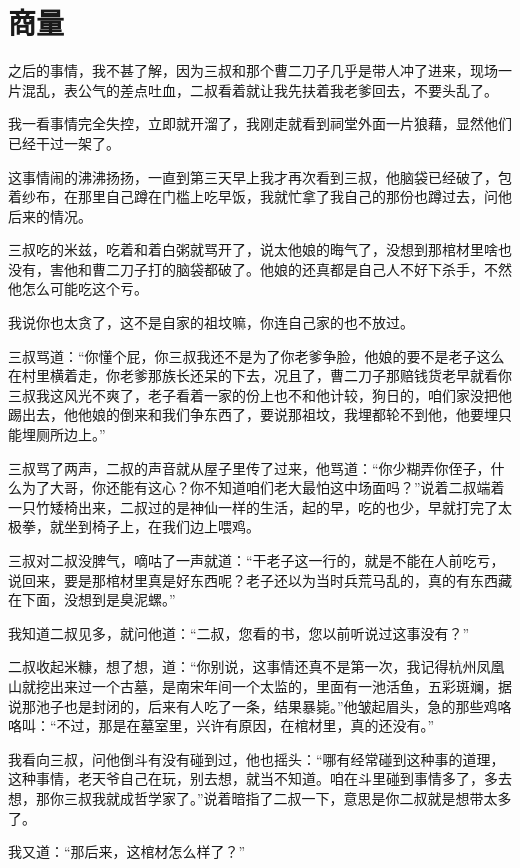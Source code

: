 \chapter{商量}

之后的事情，我不甚了解，因为三叔和那个曹二刀子几乎是带人冲了进来，现场一片混乱，表公气的差点吐血，二叔看着就让我先扶着我老爹回去，不要头乱了。

我一看事情完全失控，立即就开溜了，我刚走就看到祠堂外面一片狼藉，显然他们已经干过一架了。

这事情闹的沸沸扬扬，一直到第三天早上我才再次看到三叔，他脑袋已经破了，包着纱布，在那里自己蹲在门槛上吃早饭，我就忙拿了我自己的那份也蹲过去，问他后来的情况。

三叔吃的米兹，吃着和着白粥就骂开了，说太他娘的晦气了，没想到那棺材里啥也没有，害他和曹二刀子打的脑袋都破了。他娘的还真都是自己人不好下杀手，不然他怎么可能吃这个亏。

我说你也太贪了，这不是自家的祖坟嘛，你连自己家的也不放过。

三叔骂道：“你懂个屁，你三叔我还不是为了你老爹争脸，他娘的要不是老子这么在村里横着走，你老爹那族长还呆的下去，况且了，曹二刀子那赔钱货老早就看你三叔我这风光不爽了，老子看着一家的份上也不和他计较，狗日的，咱们家没把他踢出去，他他娘的倒来和我们争东西了，要说那祖坟，我埋都轮不到他，他要埋只能埋厕所边上。”

三叔骂了两声，二叔的声音就从屋子里传了过来，他骂道：“你少糊弄你侄子，什么为了大哥，你还能有这心？你不知道咱们老大最怕这中场面吗？”说着二叔端着一只竹矮椅出来，二叔过的是神仙一样的生活，起的早，吃的也少，早就打完了太极拳，就坐到椅子上，在我们边上喂鸡。

三叔对二叔没脾气，嘀咕了一声就道：“干老子这一行的，就是不能在人前吃亏，说回来，要是那棺材里真是好东西呢？老子还以为当时兵荒马乱的，真的有东西藏在下面，没想到是臭泥螺。”

我知道二叔见多，就问他道：“二叔，您看的书，您以前听说过这事没有？”

二叔收起米糠，想了想，道：“你别说，这事情还真不是第一次，我记得杭州凤凰山就挖出来过一个古墓，是南宋年间一个太监的，里面有一池活鱼，五彩斑斓，据说那池子也是封闭的，后来有人吃了一条，结果暴毙。”他皱起眉头，急的那些鸡咯咯叫：“不过，那是在墓室里，兴许有原因，在棺材里，真的还没有。”

我看向三叔，问他倒斗有没有碰到过，他也摇头：“哪有经常碰到这种事的道理，这种事情，老天爷自己在玩，别去想，就当不知道。咱在斗里碰到事情多了，多去想，那你三叔我就成哲学家了。”说着暗指了二叔一下，意思是你二叔就是想带太多了。

我又道：“那后来，这棺材怎么样了？”

